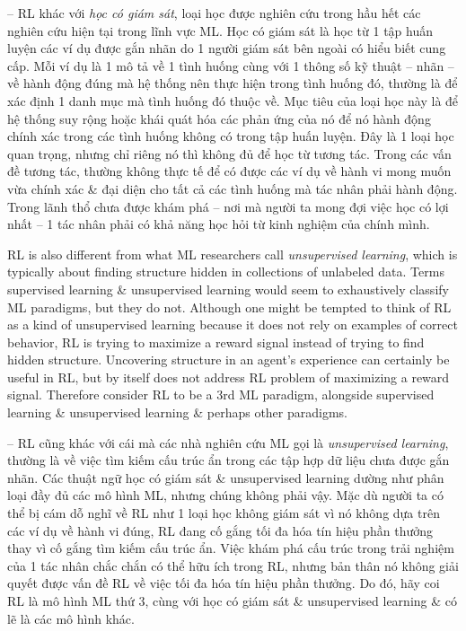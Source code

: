 \documentclass{article}
\begin{document}
\begin{itemize}
\begin{itemize}
        -- RL khác với {\it học có giám sát}, loại học được nghiên cứu trong hầu hết các nghiên cứu hiện tại trong lĩnh vực ML. Học có giám sát là học từ 1 tập huấn luyện các ví dụ được gắn nhãn do 1 người giám sát bên ngoài có hiểu biết cung cấp. Mỗi ví dụ là 1 mô tả về 1 tình huống cùng với 1 thông số kỹ thuật -- nhãn -- về hành động đúng mà hệ thống nên thực hiện trong tình huống đó, thường là để xác định 1 danh mục mà tình huống đó thuộc về. Mục tiêu của loại học này là để hệ thống suy rộng hoặc khái quát hóa các phản ứng của nó để nó hành động chính xác trong các tình huống không có trong tập huấn luyện. Đây là 1 loại học quan trọng, nhưng chỉ riêng nó thì không đủ để học từ tương tác. Trong các vấn đề tương tác, thường không thực tế để có được các ví dụ về hành vi mong muốn vừa chính xác \& đại diện cho tất cả các tình huống mà tác nhân phải hành động. Trong lãnh thổ chưa được khám phá -- nơi mà người ta mong đợi việc học có lợi nhất -- 1 tác nhân phải có khả năng học hỏi từ kinh nghiệm của chính mình.

        RL is also different from what ML researchers call {\it unsupervised learning}, which is typically about finding structure hidden in collections of unlabeled data. Terms supervised learning \& unsupervised learning would seem to exhaustively classify ML paradigms, but they do not. Although one might be tempted to think of RL as a kind of unsupervised learning because it does not rely on examples of correct behavior, RL is trying to maximize a reward signal instead of trying to find hidden structure. Uncovering structure in an agent's experience can certainly be useful in RL, but by itself does not address RL problem of maximizing a reward signal. Therefore consider RL to be a 3rd ML paradigm, alongside supervised learning \& unsupervised learning \& perhaps other paradigms.

        -- RL cũng khác với cái mà các nhà nghiên cứu ML gọi là {\it unsupervised learning}, thường là về việc tìm kiếm cấu trúc ẩn trong các tập hợp dữ liệu chưa được gắn nhãn. Các thuật ngữ học có giám sát \& unsupervised learning dường như phân loại đầy đủ các mô hình ML, nhưng chúng không phải vậy. Mặc dù người ta có thể bị cám dỗ nghĩ về RL như 1 loại học không giám sát vì nó không dựa trên các ví dụ về hành vi đúng, RL đang cố gắng tối đa hóa tín hiệu phần thưởng thay vì cố gắng tìm kiếm cấu trúc ẩn. Việc khám phá cấu trúc trong trải nghiệm của 1 tác nhân chắc chắn có thể hữu ích trong RL, nhưng bản thân nó không giải quyết được vấn đề RL về việc tối đa hóa tín hiệu phần thưởng. Do đó, hãy coi RL là mô hình ML thứ 3, cùng với học có giám sát \& unsupervised learning \& có lẽ là các mô hình khác.


\end{itemize}
\end{itemize}
\end{document}
